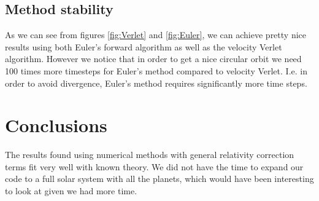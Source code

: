 \documentclass[a4paper, fontsize=11pt]{article}
\begin{document}
\subsection{Method stability} 




As we can see from figures \ref{fig:Verlet} and \ref{fig:Euler}, we can achieve pretty nice results using both Euler's forward algorithm as well as the velocity Verlet algorithm. However we notice that in order to get a nice circular orbit we need 100 times more timesteps for Euler's method compared to velocity Verlet. I.e. in order to avoid divergence, Euler's method requires significantly more time steps.



\section{Conclusions}

The results found using numerical methods with general relativity correction terms fit very well with known theory. We did not have the time to expand our code to a full solar system with all the planets, which would have been interesting to look at given we had more time.




\end{document}
